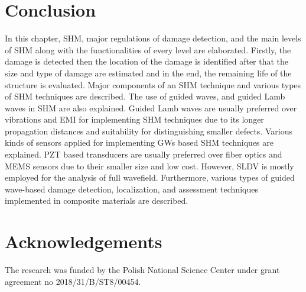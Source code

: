 \documentclass[b5paper, 11pt, titlepage]{book}
\begin{document}
\section{Conclusion}
In this chapter, SHM, major regulations of damage detection, and the main levels of SHM along with the functionalities of every level are elaborated. Firstly, the damage is detected then the location of the damage is identified after that the size and type of damage are estimated and in the end, the remaining life of the structure is evaluated. Major components of an SHM technique and various types of SHM techniques are described. The use of guided waves, and guided Lamb waves in SHM are also explained. Guided Lamb waves are usually preferred over vibrations and EMI for implementing SHM techniques due to its longer propagation distances and suitability for distinguishing smaller defects. Various kinds of sensors applied for implementing GWs based SHM techniques are explained. PZT based transducers are usually preferred over fiber optics and MEMS sensors due to their smaller size and low cost. However, SLDV is mostly employed for the analysis of full wavefield. Furthermore, various types of guided wave-based damage detection, localization, and assessment techniques implemented in composite materials are described.

\section*{Acknowledgements}

The research was funded by the Polish National Science Center under grant agreement no 2018/31/B/ST8/00454.




\end{document}
